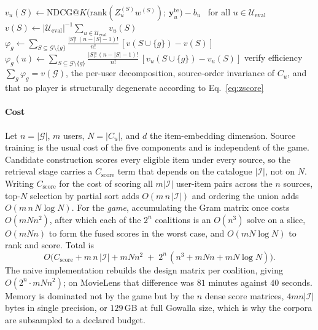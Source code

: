 \documentclass[pdflatex,sn-basic,Numbered]{sn-jnl}
\makeatletter
\theoremstyle{plain}
\theoremstyle{definition}
\newcommand{\G}{\mathcal{G}}
\newcommand{\Ueval}{\mathcal{U}_{\mathrm{eval}}}
\newcommand{\NDCGat}[1]{\mathrm{NDCG@}#1}
\makeatother
\begin{document}
\begin{algorithm}[tbp]
\begin{algorithmic}[1]
    \EndIf
    \State $v_u(S) \gets \NDCGat{K}\bigl(\mathrm{rank}(Z_u^{(S)} w^{(S)});\,
           \mathbf{y}^{\mathrm{te}}_u\bigr) - b_u$ \ for all $u\in\Ueval$
  \EndIf
  \State $v(S) \gets |\Ueval|^{-1}\sum_{u\in\Ueval}v_u(S)$
\EndFor
\For{each $g \in \G$}
  \State $\varphi_g \gets \sum_{S \subseteq \G \setminus \{g\}}
         \tfrac{|S|!\,(n-|S|-1)!}{n!}\,[v(S \cup \{g\}) - v(S)]$
  \State $\varphi_g(u) \gets \sum_{S \subseteq \G \setminus \{g\}}
         \tfrac{|S|!\,(n-|S|-1)!}{n!}\,[v_u(S \cup \{g\}) - v_u(S)]$
\EndFor
\State verify efficiency $\sum_g \varphi_g = v(\G)$, the per-user decomposition,
       source-order invariance of $C_u$, and that no player is structurally
       degenerate according to Eq.~\eqref{eq:zscore}
\end{algorithmic}
\end{algorithm}

\paragraph{Cost}
Let $n = |\G|$, $m$ users, $N = |C_u|$, and $d$ the item-embedding dimension.
Source training is the usual cost of the five components and is independent of
the game. Candidate construction scores every eligible item under every source,
so the retrieval stage carries a $C_{\mathrm{score}}$ term that depends on the
catalogue $|\mathcal{I}|$, not on $N$. Writing $C_{\mathrm{score}}$ for the cost
of scoring all $m|\mathcal{I}|$ user-item pairs across the $n$ sources, top-$N$
selection by partial sort adds $O(m\,n\,|\mathcal{I}|)$ and ordering the union
adds $O(m\,n\,N\log N)$. For the \emph{game}, accumulating the Gram matrix once
costs $O(m N n^2)$, after which each of the
$2^n$ coalitions is an $O(n^3)$ solve on a slice, $O(mNn)$ to form the fused
scores in the worst case, and $O(mN\log N)$ to rank and score. Total is
%
\begin{equation}
O\bigl(C_{\mathrm{score}} + m\,n\,|\mathcal{I}| + m N n^2
 \;+\; 2^n\,(n^3 + mNn + mN\log N)\bigr).
\label{eq:complexity}
\end{equation}
%
The naive implementation rebuilds the design matrix per coalition, giving
$O(2^n \cdot mNn^2)$; on MovieLens that difference was $81$ minutes against
$40$ seconds. Memory is dominated not by the game but by the $n$ dense score
matrices, $4mn|\mathcal{I}|$ bytes in single precision, or $129$\,GB at full Gowalla size, which is why the corpora are subsampled to a declared budget.
\end{document}
